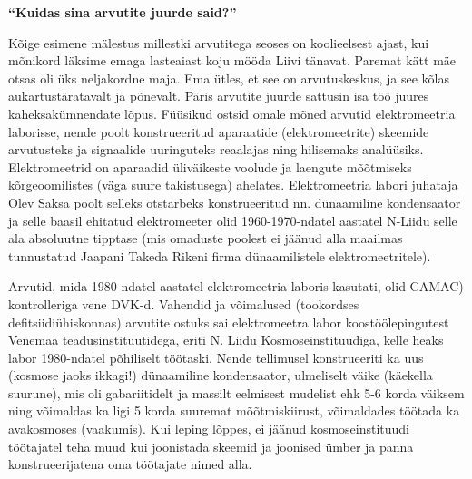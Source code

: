 
\textbf{\enquote{Kuidas sina arvutite juurde said?}}

Kõige esimene mälestus millestki arvutitega seoses on koolieelsest ajast, kui
mõnikord läksime emaga lasteaiast koju mööda Liivi tänavat. Paremat kätt mäe
otsas oli üks neljakordne maja. Ema ütles, et see on arvutuskeskus, ja see
kõlas aukartustäratavalt ja põnevalt.  Päris arvutite juurde sattusin isa töö
juures kaheksakümnendate lõpus. Füüsikud ostsid omale mõned arvutid
elektromeetria laborisse, nende poolt konstrueeritud aparaatide
(elektromeetrite) skeemide arvutusteks ja signaalide uuringuteks reaalajas ning
hilisemaks analüüsiks. Elektromeetrid on aparaadid üliväikeste voolude ja
laengute mõõtmiseks kõrgeoomilistes (väga suure takistusega) ahelates.
Elektromeetria labori juhataja Olev Saksa poolt selleks
otstarbeks konstrueeritud nn. dünaamiline kondensaator ja selle baasil ehitatud
elektromeeter olid 1960-1970-ndatel aastatel N-Liidu selle ala absoluutne
tipptase (mis omaduste poolest ei jäänud alla maailmas tunnustatud Jaapani
Takeda Rikeni firma dünaamilistele elektromeetritele).

Arvutid, mida 1980-ndatel aastatel elektromeetria laboris kasutati, olid
CAMAC) kontrolleriga vene
DVK-d.
Vahendid ja võimalused (tookordses defitsiidiühiskonnas) arvutite ostuks sai
elektromeetra labor koostöölepingutest Venemaa teadusinstituutidega, eriti N.
Liidu Kosmoseinstituudiga, kelle heaks labor 1980-ndatel põhiliselt töötaski.
Nende tellimusel konstrueeriti ka uus (kosmose jaoks ikkagi!) dünaamiline
kondensaator, ulmeliselt väike (käekella suurune), mis oli gabariitidelt ja
massilt eelmisest mudelist ehk 5-6 korda väiksem ning võimaldas ka ligi 5 korda
suuremat mõõtmiskiirust, võimaldades töötada ka avakosmoses (vaakumis). Kui
leping lõppes, ei jäänud kosmoseinstituudi töötajatel teha muud kui joonistada
skeemid ja joonised ümber ja panna konstrueerijatena oma töötajate nimed alla.

